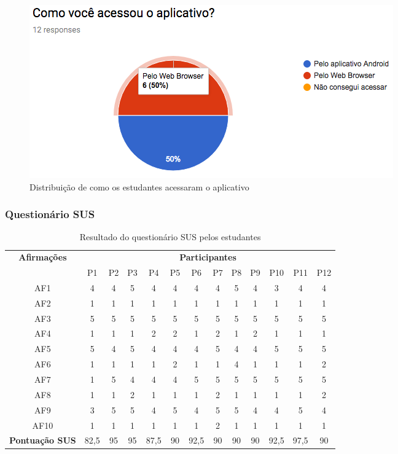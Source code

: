 \begin{figure}[H]
  \centering
  \caption{Distribuição de como os estudantes acessaram o aplicativo}
  \label{fig:acesso}
  \includegraphics[scale=.6]{imagens/acesso}
  \doautor
\end{figure}

\subsubsection{Questionário SUS}

\begin{table}[!ht]
  \centering
  \caption{Resultado do questionário SUS pelos estudantes}
  \label{tab:sus_result_students}
  \begin{tabular}{c||cccccccccccc}
    \hline
    \multirow{2}{*}{\textbf{Afirmações}} & \multicolumn{12}{c}{\textbf{Participantes}}\tabularnewline
     & P1 & P2 & P3 & P4 & P5 & P6 & P7 & P8 & P9 & P10 & P11 & P12\tabularnewline
    \hline
    AF1 & 4 & 4 & 5 & 4 & 4 & 4 & 4 & 5 & 4 & 3 & 4 & 4\tabularnewline
    AF2 & 1 & 1 & 1 & 1 & 1 & 1 & 1 & 1 & 1 & 1 & 1 & 1\tabularnewline
    AF3 & 5 & 5 & 5 & 5 & 5 & 5 & 5 & 5 & 5 & 5 & 5 & 5\tabularnewline
    AF4 & 1 & 1 & 1 & 2 & 2 & 1 & 2 & 1 & 2 & 1 & 1 & 1\tabularnewline
    AF5 & 5 & 4 & 5 & 4 & 4 & 4 & 5 & 4 & 4 & 5 & 5 & 5\tabularnewline
    AF6 & 1 & 1 & 1 & 1 & 2 & 1 & 1 & 4 & 1 & 1 & 1 & 2\tabularnewline
    AF7 & 1 & 5 & 4 & 4 & 4 & 5 & 5 & 5 & 5 & 5 & 5 & 5\tabularnewline
    AF8 & 1 & 1 & 2 & 1 & 1 & 1 & 2 & 1 & 1 & 1 & 1 & 2\tabularnewline
    AF9 & 3 & 5 & 5 & 4 & 5 & 4 & 5 & 5 & 4 & 4 & 5 & 4\tabularnewline
    AF10 & 1 & 1 & 1 & 1 & 1 & 1 & 2 & 1 & 1 & 1 & 1 & 1\tabularnewline
    \hline
    \textbf{Pontuação SUS} & 82,5 & 95 & 95 & 87,5 & 90 & 92,5 & 90 & 90 & 90 & 92,5 & 97,5 & 90\tabularnewline
    \hline
  \end{tabular}
  \doautor
\end{table}

